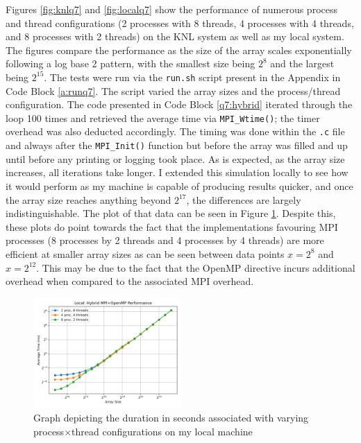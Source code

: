 \documentclass[11pt]{article}
\begin{document}
Figures \ref{fig:knlq7} and \ref{fig:localq7} show the performance of numerous process and thread configurations (2 processes with 8 threads, 4 processes with 4 threads, and 8 processes with 2 threads) on the KNL system as well as my local system.
The figures compare the performance as the size of the array scales exponentially following a log base 2 pattern, with the smallest size being $2^8$ and the largest being $2^{15}$.
The tests were run via the \texttt{run.sh} script present in the Appendix in Code Block \ref{a:runq7}.
The script varied the array sizes and the process/thread configuration.
The code presented in Code Block \ref{q7:hybrid} iterated through the loop 100 times and retrieved the average time via \texttt{MPI\_Wtime()}; the timer overhead was also deducted accordingly.
The timing was done within the \texttt{.c} file and always after the \texttt{MPI\_Init()} function but before the array was filled and up until before any printing or logging took place.
As is expected, as the array size increases, all iterations take longer.
I extended this simulation locally to see how it would perform as my machine is capable of producing results quicker, and once the array size reaches anything beyond $2^{17}$, the differences are largely indistinguishable.
The plot of that data can be seen in Figure \ref{fig:bigq7}.
Despite this, these plots do point towards the fact that the implementations favouring MPI processes (8 processes by 2 threads and 4 processes by 4 threads) are more efficient at smaller array sizes as can be seen between data points $x=2^8$ and $x=2^{12}$.
This may be due to the fact that the OpenMP directive incurs additional overhead when compared to the associated MPI overhead.

\begin{figure}[H]
\centering
    \includegraphics[width=0.5\textwidth]{./images/bigq7.png}
\caption{Graph depicting the duration in seconds associated with varying process$\times$thread configurations on my local machine}
\label{fig:bigq7}
\end{figure}
\end{document}
